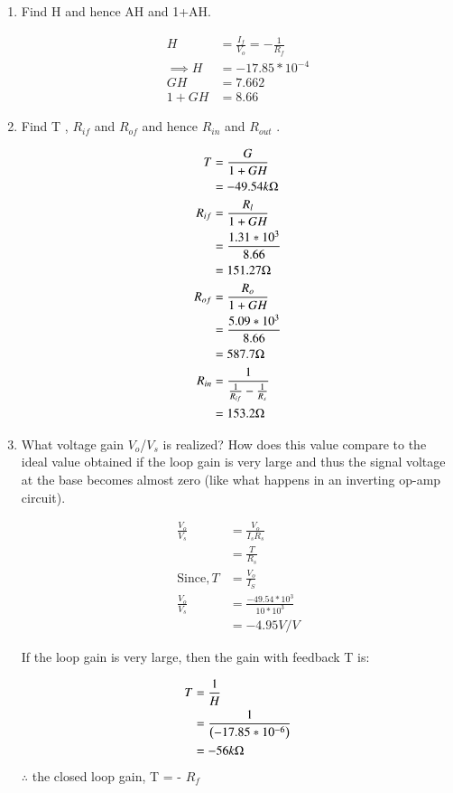 \begin{enumerate}[label=\thesection.\arabic*.,ref=\thesection.\theenumi]
\item Find H and hence AH and 1+AH.

\solution 
\begin{align}
    H &= \frac{I_{f}}{V_{o}}
    = -\frac{1}{R_{f}}\\
    \implies H &= -17.85*10^{-4}\\
    GH &= 7.662\\
    1 + GH &= 8.66
\end{align}

\item Find T , $R_{if}$  and $R_{of}$ and hence $R_{in}$ and $R_{out}$ .

\solution 
\begin{align}
    T &= \frac{G}{1+GH}\\
    &= -49.54 k\ohm\\
    R_{if} &= \frac{R_{l}}{1 + GH}\\
    &= \frac{1.31*10^3}{8.66}\\
    &= 151.27 \ohm\\
    R_{of} &= \frac{R_{o}}{1+GH}\\
    &= \frac{5.09*10^3}{8.66}\\
    &= 587.7 \ohm\\
    R_{in} &= \frac{1}{\frac{1}{R_{if}} - \frac{1}{R_{s}}}\\
    &=153.2 \ohm
\end{align}

\item What voltage gain $V_{o}$/$V_{s}$ is realized? How does this value
compare to the ideal value obtained if the loop gain is
very large and thus the signal voltage at the base becomes
almost zero (like what happens in an inverting op-amp
circuit).

\solution 
\begin{align}
    \frac{V_{o}}{V_{s}} &= \frac{V_{o}}{I_{s}R_{s}}\\
    &= \frac{T}{R_{s}}\\
    \text{Since}, T &= \frac{V_{o}}{I_{S}}\\
    \frac{V_{o}}{V_{s}} &= \frac{-49.54*10^3}{10*10^3}\\
    &= -4.95 V/V
\end{align}

If the loop gain is very large, then the gain with feedback T is:

\begin{align}
    T &= \frac{1}{H}\\
    &= \frac{1}{\left(-17.85*10^{-6}\right)}\\
    &= -56k\ohm
\end{align}
$\therefore$  the closed loop gain,  T = - $R_{f}$


\end{enumerate}
